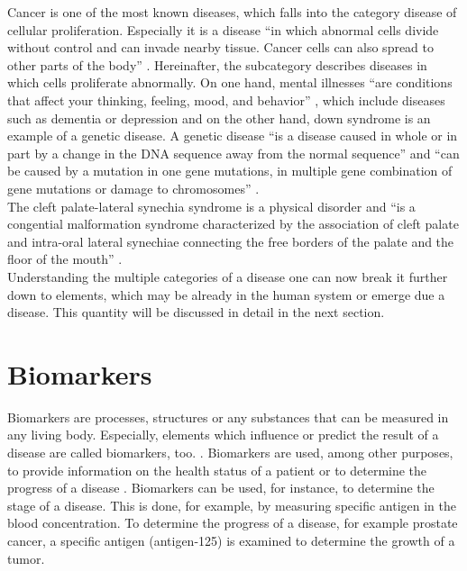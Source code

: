 Cancer is one of the most known diseases, which falls into the category disease of cellular proliferation. Especially it is a disease \enquote{in which abnormal cells divide without control and can invade nearby tissue. Cancer cells can also spread to other parts of the body} \citep{noauthor_nci_2011}. Hereinafter, the subcategory describes diseases in which cells proliferate abnormally. On one hand, mental illnesses \enquote{are conditions that affect your thinking, feeling, mood, and behavior} \citep{noauthor_mental_nodate}, which include diseases such as dementia or depression and on the other hand, down syndrome is an example of a genetic disease. A genetic disease \enquote{is a disease caused in whole or in part by a change in the \ac{DNA} sequence away from the normal sequence} and \enquote{can be caused by a mutation in one gene mutations, in multiple gene combination of gene mutations or damage to chromosomes} \citep{noauthor_genetic_nodate}. \\

The cleft palate-lateral synechia syndrome is a physical disorder and \enquote{is a congential malformation syndrome characterized by the association of cleft palate and intra-oral lateral synechiae connecting the free borders of the palate and the floor of the mouth} \citep{reserved_orphanet_nodate}.\\

Understanding the multiple categories of a disease one can now break it further down to elements, which may be already in the human system or emerge due a disease. This quantity will be discussed in detail in the next section.

\section{Biomarkers}
Biomarkers are processes, structures or any substances that can be measured in any living body. Especially, elements which influence or predict the result of a disease are called biomarkers, too. \citep{noauthor_biomarkers_nodate}. Biomarkers are used, among other purposes, to provide information on the health status of a patient or to determine the progress of a disease  \citep{atkinson_biomarkers_2001, mayeux_biomarkers:_2004}. Biomarkers can be used, for instance,  to determine the stage of a disease. This is done, for example, by measuring specific antigen in the blood concentration. To determine the progress of a disease, for example prostate cancer, a specific antigen (antigen-125) \citep{atkinson_biomarkers_2001} is examined to determine the growth of a tumor. 

